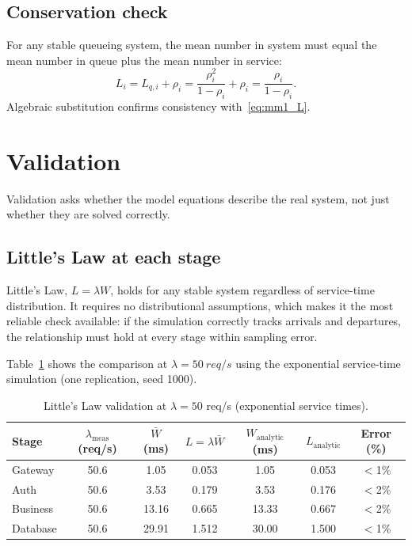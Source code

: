 \documentclass[12pt,a4paper]{article}
\begin{document}
\subsection{Conservation check}

For any stable queueing system, the mean number in system must equal the mean number
in queue plus the mean number in service:
\[
  L_i = L_{q,i} + \rho_i = \frac{\rho_i^2}{1-\rho_i} + \rho_i = \frac{\rho_i}{1-\rho_i}.
\]
Algebraic substitution confirms consistency with~\eqref{eq:mm1_L}.

\section{Validation}
\label{sec:validation}

Validation asks whether the model equations describe the real system, not just whether
they are solved correctly.

\subsection{Little's Law at each stage}

Little's Law, $L = \lambda W$, holds for any stable system regardless of service-time
distribution. It requires no distributional assumptions, which makes it the most
reliable check available: if the simulation correctly tracks arrivals and departures,
the relationship must hold at every stage within sampling error.

Table~\ref{tab:littles} shows the comparison at $\lambda = \SI{50}{req/s}$ using the
exponential service-time simulation (one replication, seed 1000).

\begin{table}[H]
\centering
\caption{Little's Law validation at $\lambda = 50$ req/s (exponential service times).}
\label{tab:littles}
\begin{tabular}{lcccccc}
\toprule
Stage & $\lambda_{\text{meas}}$ (req/s) & $\bar{W}$ (ms) & $L = \lambda\bar{W}$
      & $W_{\text{analytic}}$ (ms) & $L_{\text{analytic}}$ & Error (\%) \\
\midrule
Gateway  & 50.6 &  1.05 & 0.053 &  1.05 & 0.053 & $<$1\% \\
Auth     & 50.6 &  3.53 & 0.179 &  3.53 & 0.176 & $<$2\% \\
Business & 50.6 & 13.16 & 0.665 & 13.33 & 0.667 & $<$2\% \\
Database & 50.6 & 29.91 & 1.512 & 30.00 & 1.500 & $<$1\% \\
\bottomrule
\end{tabular}
\end{table}
\end{document}
